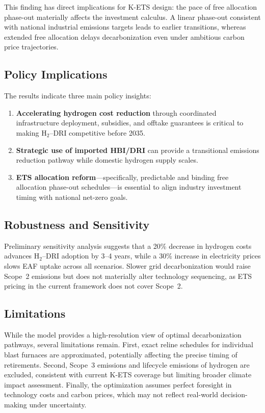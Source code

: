 \documentclass[preprint,5p,authoryear]{elsarticle}
\begin{document}
This finding has direct implications for K-ETS design: the pace of free allocation phase-out materially affects the investment calculus. A linear phase-out consistent with national industrial emissions targets leads to earlier transitions, whereas extended free allocation delays decarbonization even under ambitious carbon price trajectories.

\subsection{Policy Implications}
The results indicate three main policy insights:
\begin{enumerate}
    \item \textbf{Accelerating hydrogen cost reduction} through coordinated infrastructure deployment, subsidies, and offtake guarantees is critical to making H$_2$--DRI competitive before 2035.
    \item \textbf{Strategic use of imported HBI/DRI} can provide a transitional emissions reduction pathway while domestic hydrogen supply scales.
    \item \textbf{ETS allocation reform}---specifically, predictable and binding free allocation phase-out schedules---is essential to align industry investment timing with national net-zero goals.
\end{enumerate}

\subsection{Robustness and Sensitivity}
Preliminary sensitivity analysis suggests that a 20\% decrease in hydrogen costs advances H$_2$--DRI adoption by 3--4 years, while a 30\% increase in electricity prices slows EAF uptake across all scenarios. Slower grid decarbonization would raise Scope~2 emissions but does not materially alter technology sequencing, as ETS pricing in the current framework does not cover Scope~2.

\subsection{Limitations}
While the model provides a high-resolution view of optimal decarbonization pathways, several limitations remain. First, exact reline schedules for individual blast furnaces are approximated, potentially affecting the precise timing of retirements. Second, Scope~3 emissions and lifecycle emissions of hydrogen are excluded, consistent with current K-ETS coverage but limiting broader climate impact assessment. Finally, the optimization assumes perfect foresight in technology costs and carbon prices, which may not reflect real-world decision-making under uncertainty.
\end{document}
